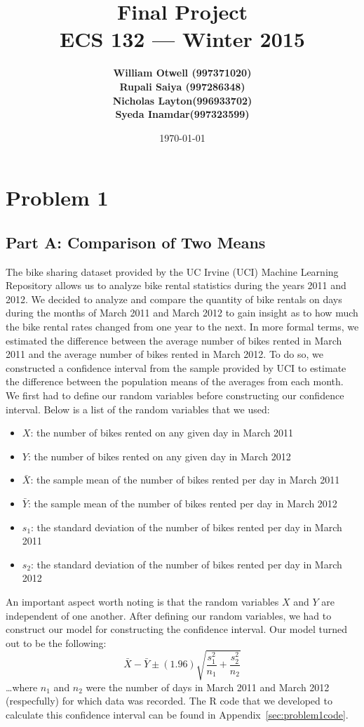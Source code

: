 \documentclass[11pt]{article}
\title{\vspace{-3ex}\bf Final Project\\[2ex] 
       \normalsize ECS 132 --- Winter 2015}
\date{\today}
\author{\bf William Otwell (997371020)\\ \bf Rupali Saiya (997286348)\\ \bf Nicholas Layton(996933702)\\ \bf Syeda Inamdar(997323599)\\}
\begin{document}
\maketitle
\pagebreak
\tableofcontents
\pagebreak

\section{Problem 1}
\label{sec:problem1}
\subsection{Part A: Comparison of Two Means}
\label{subsec:1a}
The bike sharing dataset provided by the UC Irvine (UCI) Machine Learning Repository allows us to analyze bike rental statistics during the years 2011 and 2012. We decided to analyze and compare the quantity of bike rentals on days during the months of March 2011 and March 2012 to gain insight as to how much the bike rental rates changed from one year to the next. In more formal terms, we estimated the difference between the average number of bikes rented in March 2011 and the average number of bikes rented in March 2012. To do so, we constructed a confidence interval from the sample provided by UCI to estimate the difference between the population means of the averages from each month. We first had to define our random variables before constructing our confidence interval. Below is a list of the random variables that we used:
\begin{itemize}
	\item $X$: the number of bikes rented on any given day in March 2011
	\item $Y$: the number of bikes rented on any given day in March 2012
	\item $\bar{X}$: the sample mean of the number of bikes rented per day in March 2011
	\item $\bar{Y}$: the sample mean of the number of bikes rented per day in March 2012
	\item $s_1$: the standard deviation of the number of bikes rented per day in March 2011
	\item $s_2$: the standard deviation of the number of bikes rented per day in March 2012
\end{itemize}
An important aspect worth noting is that the random variables $X$ and $Y$ are independent of one another. After defining our random variables, we had to construct our model for constructing the confidence interval. Our model turned out to be the following:
\begin{equation}
\bar{X} - \bar{Y} \pm (1.96) \sqrt{\frac{s_{1}^{2}}{n_1} + \frac{s_{2}^{2}}{n_2}}
\end{equation}
\dots where $n_1$ and $n_2$ were the number of days in March 2011 and March 2012 (respecfully) for which data was recorded. The R code that we developed to calculate this confidence interval can be found in Appendix~\ref{sec:problem1code}.
\end{document}
